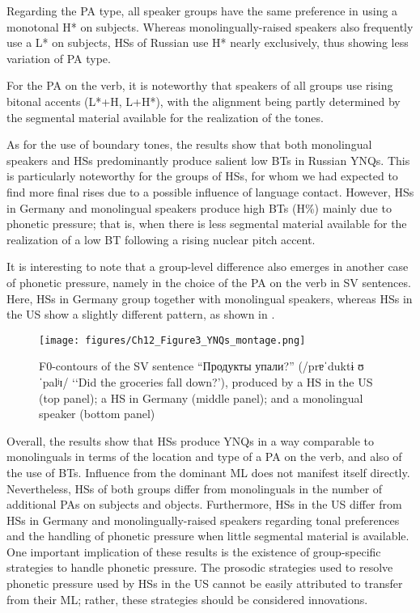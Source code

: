 \documentclass[output=paper,colorlinks,citecolor=brown]{langscibook}
\begin{document}
Regarding the PA type, all speaker groups have the same preference in using a monotonal H* on subjects. Whereas monolingually-raised speakers also frequently use a L* on subjects, HSs of Russian use H* nearly exclusively, thus showing less variation of PA type.

For the PA on the verb, it is noteworthy that speakers of all groups use rising bitonal accents (L*+H, L+H*), with the alignment being partly determined by the segmental material available for the realization of the tones.

As for the use of boundary tones, the results show that both monolingual speakers and HSs predominantly produce salient low BTs in Russian YNQs. This is particularly noteworthy for the groups of HSs, for whom we had expected to find more final rises due to a possible influence of language contact. However, HSs in Germany and monolingual speakers produce high BTs (H\%) mainly due to phonetic pressure; that is, when there is less segmental material available for the realization of a low BT following a rising nuclear pitch accent.

It is interesting to note that a group-level difference also emerges in another case of phonetic pressure, namely in the choice of the PA on the verb in SV sentences. Here, HSs in Germany group together with monolingual speakers, whereas HSs in the US show a slightly different pattern, as shown in .

\begin{figure}
  \centering
  \texttt{[image: figures/Ch12\_Figure3\_YNQs\_montage.png]}
  \caption{F0-contours of the SV sentence “Продукты упали?” (/prɐˈduktɨ ʊˈpalʲɪ/ ‘‘Did the groceries fall down?’), produced by a HS in the US (top panel); a HS in Germany (middle panel); and a monolingual speaker (bottom panel)}
  \label{chapter12:fig:3}
\end{figure}

Overall, the results show that HSs produce YNQs in a way comparable to monolinguals in terms of the location and type of a PA on the verb, and also of the use of BTs. Influence from the dominant ML does not manifest itself directly. Nevertheless, HSs of both groups differ from monolinguals in the number of additional PAs on subjects and objects. Furthermore, HSs in the US differ from HSs in Germany and monolingually-raised speakers regarding tonal preferences and the handling of phonetic pressure when little segmental material is available. One important implication of these results is the existence of group-specific strategies to handle phonetic pressure. The prosodic strategies used to resolve phonetic pressure used by HSs in the US cannot be easily attributed to transfer from their ML; rather, these strategies should be considered innovations.
\end{document}
